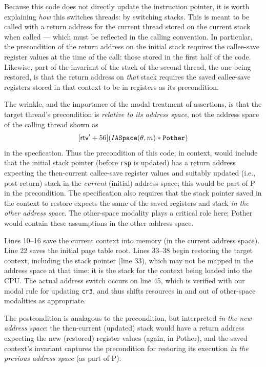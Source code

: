 \documentclass[acmsmall,screen,nonacm]{acmart}
\begin{document}
Because this code does not directly update the instruction pointer, it is worth explaining \emph{how} this switches threads: by switching stacks. This is meant to be called with a return address for the current thread stored on the current stack when called --- which must be reflected in the calling convention. In particular, the precondition of the return address on the initial stack requires the callee-save register values at the time of the call: those stored in the first half of the code.
Likewise, part of the invariant of the stack of the second thread, the one being restored, is that the return address on \emph{that} stack requires the saved callee-save registers stored in that context to be in registers as its precondition.

The wrinkle, and the importance of the modal treatment of assertions, is that the target thread's precondition is \emph{relative to its address space}, not the address space of the calling thread shown as 
\[[\textsf{rtv}'+56]( I\texttt{ASpace}(\theta,m) \ast \texttt{Pother})\]
in the specfication. 
Thus the precondition of this code,
in context, would include that the initial stack pointer (before \lstinline|rsp| is updated)
has a return address expecting the then-current callee-save register values and 
suitably updated (i.e., post-return) stack in the \emph{current} (initial) address space;
this would be part of \textsf{P} in the precondition.
The specification also requires that
the stack pointer saved in the context to restore expects the same of the saved registers and stack 
\emph{in the other address space}. 
The other-space modality plays a critical role here; \textsf{Pother} would contain these assumptions in the other
address space.

Lines 10--16 save the current context into memory (in the current address space).
Line 22 saves the initial page table root.
Lines 33--38 begin restoring the target context, including the stack pointer (line 33),
which may not be mapped in the address space at that time: it is the stack for the context being
loaded into the CPU.
The actual address switch occurs on line 45, which is verified with our modal rule for updating \lstinline|cr3|,
and thus shifts resources in and out of other-space modalities as appropriate.

The postcondition is analagous to the precondition, but interpreted \emph{in the new address space}: the then-current (updated) stack would have a return address expecting the new (restored) register values (again, in \textsf{Pother}),
and the saved context's invariant captures the precondition for restoring its execution \emph{in the previous address space} (as part of \textsf{P}). 
%
\end{document}

